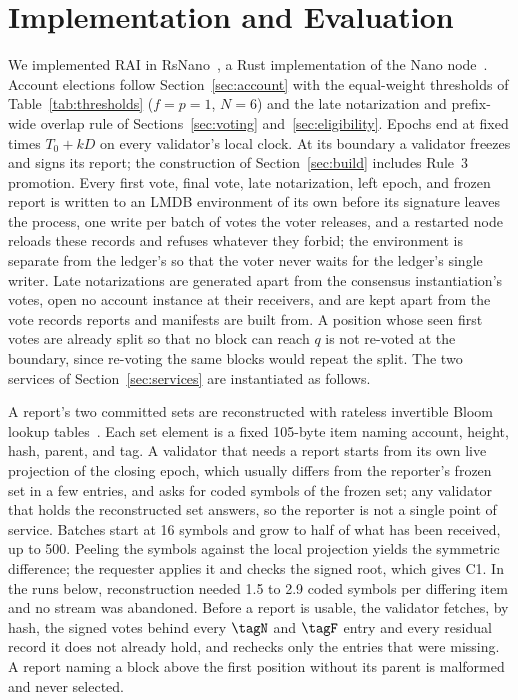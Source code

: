 \section{Implementation and Evaluation}
\label{sec:eval}
We implemented RAI in RsNano~\cite{rsnano}, a Rust implementation of the Nano node~\cite{nano}. Account elections follow Section~\ref{sec:account} with the equal-weight thresholds of Table~\ref{tab:thresholds} ($f=p=1$, $N=6$) and the late notarization and prefix-wide overlap rule of Sections~\ref{sec:voting} and~\ref{sec:eligibility}. Epochs end at fixed times $T_0+kD$ on every validator's local clock. At its boundary a validator freezes and signs its report; the construction of Section~\ref{sec:build} includes Rule~3 promotion. Every first vote, final vote, late notarization, left epoch, and frozen report is written to an LMDB environment of its own before its signature leaves the process, one write per batch of votes the voter releases, and a restarted node reloads these records and refuses whatever they forbid; the environment is separate from the ledger's so that the voter never waits for the ledger's single writer. Late notarizations are generated apart from the consensus instantiation's votes, open no account instance at their receivers, and are kept apart from the vote records reports and manifests are built from. A position whose seen first votes are already split so that no block can reach $q$ is not re-voted at the boundary, since re-voting the same blocks would repeat the split. The two services of Section~\ref{sec:services} are instantiated as follows.

A report's two committed sets are reconstructed with rateless invertible Bloom lookup tables~\cite{iblt,whatsthedifference,rateless}. Each set element is a fixed 105-byte item naming account, height, hash, parent, and tag. A validator that needs a report starts from its own live projection of the closing epoch, which usually differs from the reporter's frozen set in a few entries, and asks for coded symbols of the frozen set; any validator that holds the reconstructed set answers, so the reporter is not a single point of service. Batches start at 16 symbols and grow to half of what has been received, up to 500. Peeling the symbols against the local projection yields the symmetric difference; the requester applies it and checks the signed root, which gives C1. In the runs below, reconstruction needed 1.5 to 2.9 coded symbols per differing item and no stream was abandoned. Before a report is usable, the validator fetches, by hash, the signed votes behind every $\tagN$ and $\tagF$ entry and every residual record it does not already hold, and rechecks only the entries that were missing. A report naming a block above the first position without its parent is malformed and never selected.

